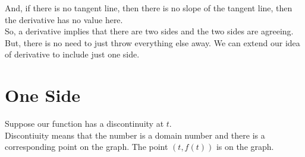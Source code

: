 \documentclass{ximera}
\begin{document}
And, if there is no tangent line, then there is no slope of the tangent line, then the derivative has no value here. \\







So, a derivative implies that there are two sides and the two sides are agreeing. \\



But, there is no need to just throw everything else away.  We can extend our idea of derivative to include just one side. \\ 


































\section{One Side}

Suppose our function has a discontinuity at $t$. \\

Discontiuity means that the number is a domain number and there is a corresponding point on the graph.  The point $(t, f(t))$ is on the graph. \\
\end{document}
